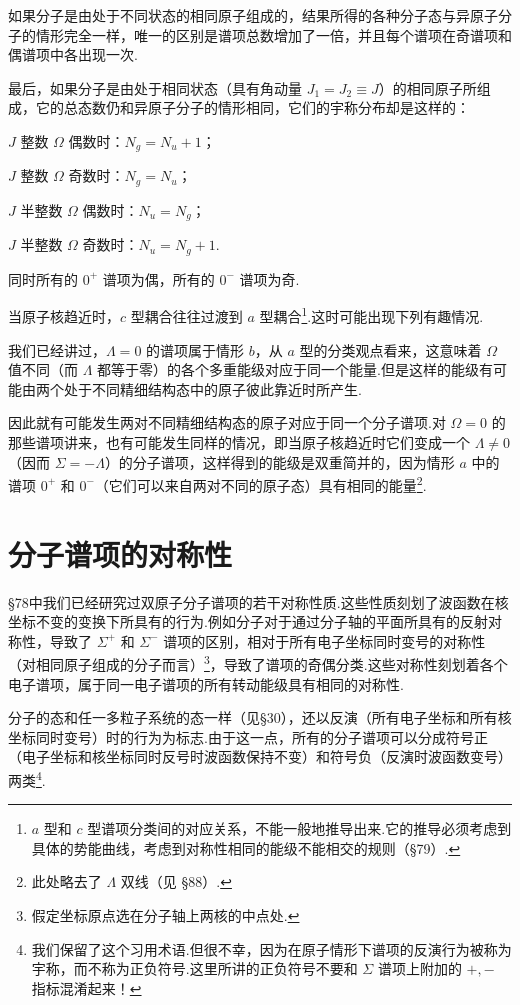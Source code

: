 如果分子是由处于不同状态的相同原子组成的，结果所得的各种分子态与异原子分子的情形完全一样，唯一的区别是谱项总数增加了一倍，并且每个谱项在奇谱项和偶谱项中各出现一次.

最后，如果分子是由处于相同状态（具有角动量 $J_1=J_2\equiv J$）的相同原子所组成，它的总态数仍和异原子分子的情形相同，它们的宇称分布却是这样的：

$J$ 整数 $\Omega$ 偶数时：$N_g=N_u+1$；

$J$ 整数 $\Omega$ 奇数时：$N_g=N_u$；

$J$ 半整数 $\Omega$ 偶数时：$N_u=N_g$；

$J$ 半整数 $\Omega$ 奇数时：$N_u=N_g+1$.

同时所有的 $0^+$ 谱项为偶，所有的 $0^-$ 谱项为奇.

当原子核趋近时，$c$ 型耦合往往过渡到 $a$ 型耦合\footnote{$a$ 型和 $c$ 型谱项分类间的对应关系，不能一般地推导出来.它的推导必须考虑到具体的势能曲线，考虑到对称性相同的能级不能相交的规则（§79）.}.这时可能出现下列有趣情况.

我们已经讲过，$\Lambda=0$ 的谱项属于情形 $b$，从 $a$ 型的分类观点看来，这意味着 $\Omega$ 值不同（而 $\Lambda$ 都等于零）的各个多重能级对应于同一个能量.但是这样的能级有可能由两个处于不同精细结构态中的原子彼此靠近时所产生.

因此就有可能发生两对不同精细结构态的原子对应于同一个分子谱项.对 $\Omega=0$ 的那些谱项讲来，也有可能发生同样的情况，即当原子核趋近时它们变成一个 $\Lambda\neq0$（因而 $\Sigma=-\Lambda$）的分子谱项，这样得到的能级是双重简并的，因为情形 $a$ 中的谱项 $0^+$ 和 $0^-$（它们可以来自两对不同的原子态）具有相同的能量\footnote{此处略去了 $\Lambda$ 双线（见 §88）.}.

\section{分子谱项的对称性}

§78中我们已经研究过双原子分子谱项的若干对称性质.这些性质刻划了波函数在核坐标不变的变换下所具有的行为.例如分子对于通过分子轴的平面所具有的反射对称性，导致了 $\Sigma^+$ 和 $\Sigma^-$ 谱项的区别，相对于所有电子坐标同时变号的对称性（对相同原子组成的分子而言）\footnote{假定坐标原点选在分子轴上两核的中点处.}，导致了谱项的奇偶分类.这些对称性刻划着各个电子谱项，属于同一电子谱项的所有转动能级具有相同的对称性.

分子的态和任一多粒子系统的态一样（见§30），还以反演（所有电子坐标和所有核坐标同时变号）时的行为为标志.由于这一点，所有的分子谱项可以分成符号正（电子坐标和核坐标同时反号时波函数保持不变）和符号负（反演时波函数变号）两类\footnote{我们保留了这个习用术语.但很不幸，因为在原子情形下谱项的反演行为被称为宇称，而不称为正负符号.这里所讲的正负符号不要和 $\Sigma$ 谱项上附加的 $+,-$ 指标混淆起来！}.

